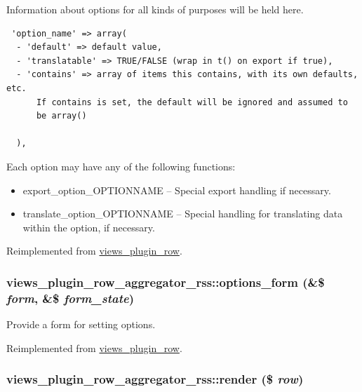 Information about options for all kinds of purposes will be held here. 

\begin{Code}\begin{verbatim} 'option_name' => array(
  - 'default' => default value,
  - 'translatable' => TRUE/FALSE (wrap in t() on export if true),
  - 'contains' => array of items this contains, with its own defaults, etc.
      If contains is set, the default will be ignored and assumed to
      be array()

  ),
\end{verbatim}
\end{Code}

 Each option may have any of the following functions:\begin{itemize}
\item export\_\-option\_\-OPTIONNAME -- Special export handling if necessary.\item translate\_\-option\_\-OPTIONNAME -- Special handling for translating data within the option, if necessary. \end{itemize}


Reimplemented from \hyperlink{classviews__plugin__row_ad6be1492eae8605e9aff37da9f19337}{views\_\-plugin\_\-row}.\hypertarget{classviews__plugin__row__aggregator__rss_a5c9bce3143901863f1a446b622fda9c}{
\subsubsection[{options\_\-form}]{\setlength{\rightskip}{0pt plus 5cm}views\_\-plugin\_\-row\_\-aggregator\_\-rss::options\_\-form (\&\$ {\em form}, \/  \&\$ {\em form\_\-state})}}
\label{classviews__plugin__row__aggregator__rss_a5c9bce3143901863f1a446b622fda9c}


Provide a form for setting options. 

Reimplemented from \hyperlink{classviews__plugin__row_6914c39d64977a0aa71da39cc1af004e}{views\_\-plugin\_\-row}.\hypertarget{classviews__plugin__row__aggregator__rss_dd4aa0892bf305556bb9a04c62da6027}{
\subsubsection[{render}]{\setlength{\rightskip}{0pt plus 5cm}views\_\-plugin\_\-row\_\-aggregator\_\-rss::render (\$ {\em row})}}
\label{classviews__plugin__row__aggregator__rss_dd4aa0892bf305556bb9a04c62da6027}


